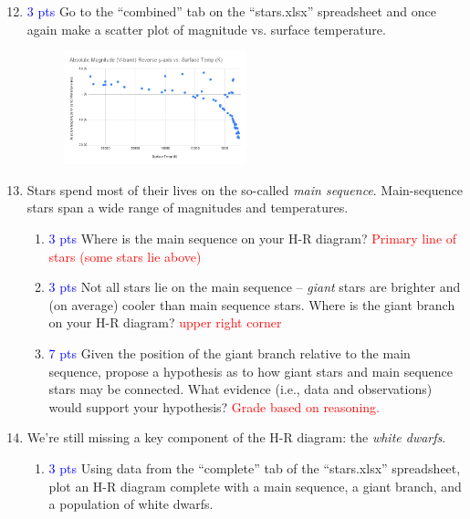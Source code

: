 \documentclass[11pt]{article}
\begin{document}
\begin{enumerate}
\setcounter{enumi}{11}

    \item \textcolor{blue}{3 pts} Go to the ``combined'' tab on the ``stars.xlsx'' spreadsheet and once again make a scatter plot of magnitude vs. surface temperature.

    \begin{figure}[h!]
        \centering
        \includegraphics[width=0.5\textwidth]{Images/mag - combine.png}
        \label{fig:my_label}
    \end{figure}
    
    \item Stars spend most of their lives on the so-called \emph{main sequence}. Main-sequence stars span a wide range of magnitudes and temperatures.
    \begin{enumerate}
        \item \textcolor{blue}{3 pts} Where is the main sequence on your H-R diagram? 
         \textcolor{red}{Primary line of stars (some stars lie above)}
        
        \item \textcolor{blue}{3 pts} Not all stars lie on the main sequence -- \emph{giant} stars are brighter and (on average) cooler than main sequence stars. Where is the giant branch on your H-R diagram?
        \textcolor{red}{upper right corner}
        
        \item \textcolor{blue}{7 pts} Given the position of the giant branch relative to the main sequence, propose a hypothesis as to how giant stars and main sequence stars may be connected. What evidence (i.e., data and observations) would support your hypothesis?
        \textcolor{red}{Grade based on reasoning.}
    
    \end{enumerate}
    
    \item We're still missing a key component of the H-R diagram: the \emph{white dwarfs}.
    \begin{enumerate}
        \item \textcolor{blue}{3 pts} Using data from the ``complete'' tab of the ``stars.xlsx'' spreadsheet, plot an H-R diagram complete with a main sequence, a giant branch, and a population of white dwarfs.


\end{enumerate}
\end{enumerate}
\end{document}
